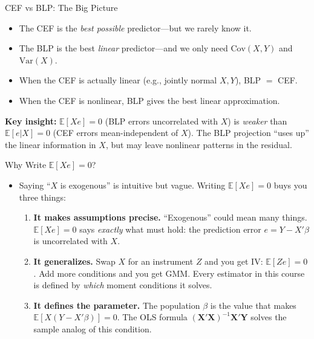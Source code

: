 \documentclass[aspectratio=169, handout, t]{beamer}
\numberwithin{equation}{section}
\begin{document}
\begin{frame}{CEF vs BLP: The Big Picture}
\begin{tcolorbox}[colback=blue!5, colframe=blue!50, title=Why Settle for Linear?]
\begin{itemize}
\item The CEF is the \emph{best possible} predictor---but we rarely know it.
\item The BLP is the best \emph{linear} predictor---and we only need $\text{Cov}(X,Y)$ and $\text{Var}(X)$.
\item When the CEF is actually linear (e.g., jointly normal $X,Y$), BLP $=$ CEF.
\item When the CEF is nonlinear, BLP gives the best linear approximation.
\end{itemize}
\end{tcolorbox}
\medskip\pause
\textbf{Key insight:}  $\mathbb{E}[Xe]=0$ (BLP errors uncorrelated with $X$) is \emph{weaker} than $\mathbb{E}[e|X]=0$ (CEF errors mean-independent of $X$).  The BLP projection ``uses up'' the linear information in $X$, but may leave nonlinear patterns in the residual.
\end{frame}


\begin{frame}{Why Write $\mathbb{E}[Xe]=0$?}
\begin{itemize}
\item Saying ``$X$ is exogenous'' is intuitive but vague.  Writing $\mathbb{E}[Xe]=0$ buys you three things:\pause
\begin{enumerate}
\item \textbf{It makes assumptions precise.}  ``Exogenous'' could mean many things.  $\mathbb{E}[Xe]=0$ says \emph{exactly} what must hold: the prediction error $e = Y - X'\beta$ is uncorrelated with $X$.\pause
\item \textbf{It generalizes.}  Swap $X$ for an instrument $Z$ and you get IV: $\mathbb{E}[Ze]=0$.  Add more conditions and you get GMM.  Every estimator in this course is defined by \emph{which} moment conditions it solves.\pause
\item \textbf{It defines the parameter.}  The population $\beta$ is the value that makes $\mathbb{E}[X(Y - X'\beta)]=0$.  The OLS formula $(\bm{X}'\bm{X})^{-1}\bm{X}'\bm{Y}$ solves the sample analog of this condition.
\end{enumerate}
\end{itemize}
\end{frame}
\end{document}

